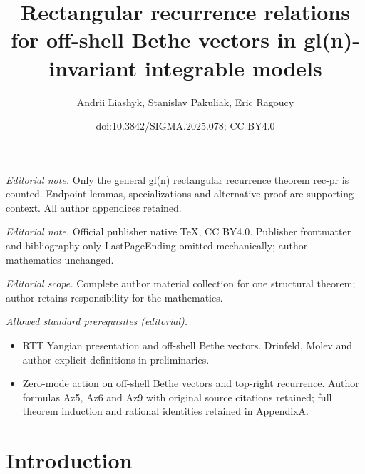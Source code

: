 \documentclass[10pt,a4paper]{amsart}
\title{Rectangular recurrence relations for off-shell Bethe vectors in gl(n)-invariant integrable models}
\author{Andrii Liashyk, Stanislav Pakuliak, Eric Ragoucy}
\date{doi:10.3842/SIGMA.2025.078; CC BY4.0}
\theoremstyle{definition}
\begin{document}
\maketitle
\noindent\textit{Editorial note.} Only the general gl(n) rectangular recurrence theorem rec-pr is counted. Endpoint lemmas, specializations and alternative proof are supporting context. All author appendices retained.\par\medskip
\noindent\textit{Editorial note.} Official publisher native TeX, CC BY4.0. Publisher frontmatter and bibliography-only LastPageEnding omitted mechanically; author mathematics unchanged.\par\medskip
\noindent\textit{Editorial scope.} Complete author material collection for one structural theorem; author retains responsibility for the mathematics.\par\medskip
\noindent\textit{Allowed standard prerequisites (editorial).}\begin{itemize}
\item RTT Yangian presentation and off-shell Bethe vectors. Drinfeld, Molev and author explicit definitions in preliminaries.
\item Zero-mode action on off-shell Bethe vectors and top-right recurrence. Author formulas Az5, Az6 and Az9 with original source citations retained; full theorem induction and rational identities retained in AppendixA.
\end{itemize}\medskip
\section{Introduction}
\end{document}
